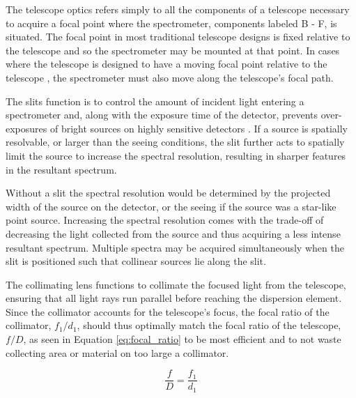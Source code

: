 The telescope optics refers simply to all the components of a telescope necessary to acquire a focal point where the spectrometer, components labeled B - F, is situated. The focal point in most traditional telescope designs is fixed relative to the telescope and so the spectrometer may be mounted at that point. In cases where the telescope is designed to have a moving focal point relative to the telescope \cite[see][]{Arecibo, HET, SALT_design}, the spectrometer must also move along the telescope's focal path.
\prgph
\prgph

The slits function is to control the amount of incident light entering a spectrometer and, along with the exposure time of the detector, prevents over-exposures of bright sources on highly sensitive detectors \citep{TonkPracAmSpec}. If a source is spatially resolvable, or larger than the seeing conditions, the slit further acts to spatially limit the source to increase the spectral resolution, resulting in sharper features in the resultant spectrum.
\prgph

Without a slit the spectral resolution would be determined by the projected width of the source on the detector, or the seeing if the source was a star-like point source. Increasing the spectral resolution comes with the trade-off of decreasing the light collected from the source and thus acquiring a less intense resultant spectrum. Multiple spectra may be acquired simultaneously when the slit is positioned such that collinear sources lie along the slit.
\prgph

The collimating lens functions to collimate the focused light from the telescope, ensuring that all light rays run parallel before reaching the dispersion element. Since the collimator accounts for the telescope's focus, the focal ratio of the collimator, $f_{1} / d_{1}$, should thus optimally match the focal ratio of the telescope, $f / D$, as seen in Equation \ref{eq:focal_ratio} to be most efficient and to not waste collecting area or material on too large a collimator.

\begin{equation}
    \frac{f}{D} = \frac{f_{1}}{d_{1}}
    \label{eq:focal_ratio}
\end{equation}

